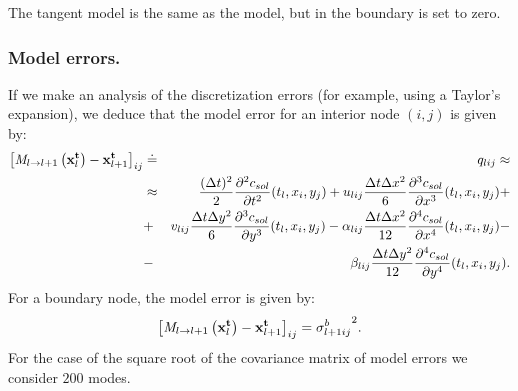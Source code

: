 \documentclass[12pt]{article}
\begin{document}
The tangent model is the same as the model, but in the boundary is set to zero.

\subsubsection{Model errors.}
If we make an analysis of the discretization errors (for example, using a Taylor's expansion), we deduce that the model error for an interior node $(i,j)$ is given by:
\begin{eqnarray}
\left[ {\it M}_{l \rightarrow l+1} \left( {\bf x}_l^{\bf t} \right) - {\bf x}_{l+1}^{\bf t} \right]_{ij} & \doteq & q_{lij}  \approx \nonumber
\\
& \approx & \frac{ ( \Delta t )^2 }{ 2 } \frac{ \partial^2 c_{sol} }{\partial t^2 }( t_l , x_i , y_j ) + u_{lij} \frac{ \Delta t \Delta x^2 }{ 6 } \frac{ \partial^3 c_{sol} }{ \partial x^3 }( t_l , x_i , y_j ) + 
\\
& + & v_{lij} \frac{ \Delta t \Delta y^2 }{ 6 } \frac{ \partial^3 c_{sol} }{ \partial y^3 }( t_l , x_i , y_j ) - \alpha_{lij} \frac{ \Delta t \Delta x^2 }{ 12 } \frac{ \partial^4 c_{sol} }{ \partial x^4 }( t_l , x_i , y_j ) -
\\
& - & \beta_{lij} \frac{ \Delta t \Delta y^2 }{ 12 } \frac{ \partial^4 c_{sol} }{ \partial y^4 }( t_l , x_i , y_j ).
\end{eqnarray}
For a boundary node, the model error is given by:
\begin{equation}
\left[ {\it M}_{l \rightarrow l+1} \left( {\bf x}_l^{\bf t} \right) - {\bf x}_{l+1}^{\bf t} \right]_{ij} = {{\sigma}_{l+1 i j}^b}^2.
\end{equation}
For the case of the square root of the covariance matrix of model errors we consider $200$ modes.
\end{document}
